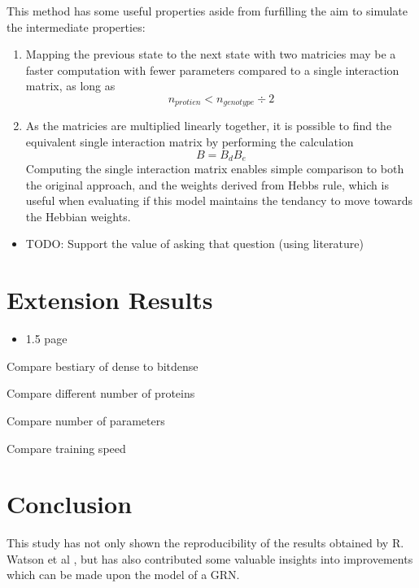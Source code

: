 \documentclass[twocolumn,a4paper,12pt]{article}
\begin{document}
    This method has some useful properties aside from furfilling the aim to simulate the intermediate properties:
    \begin{enumerate}
        \item Mapping the previous state to the next state with two matricies may be a faster computation with fewer parameters compared to a single interaction matrix, as long as
        \begin{equation}
            n_{protien} < n_{genotype} \div 2
        \end{equation}
            
        \item As the matricies are multiplied linearly together, it is possible to find the equivalent single interaction matrix by performing the calculation
        \begin{equation}
            B = B_dB_e
        \end{equation}
        Computing the single interaction matrix enables simple comparison to both the original approach, and the weights derived from Hebbs rule, which is useful when evaluating if this model maintains the tendancy to move towards the Hebbian weights.
    \end{enumerate}
    \begin{itemize}
        \item TODO: Support the value of asking that question (using literature)
    \end{itemize}


    \section{Extension Results}
    \begin{itemize}
        \item 1.5 page
    \end{itemize}

    Compare bestiary of dense to bitdense

    Compare different number of proteins

    Compare number of parameters

    Compare training speed


    \section{Conclusion}
    This study has not only shown the reproducibility of the results obtained by R. Watson et al \cite{rich}, but has also contributed some valuable insights into improvements which can be made upon the model of a GRN.
\end{document}
